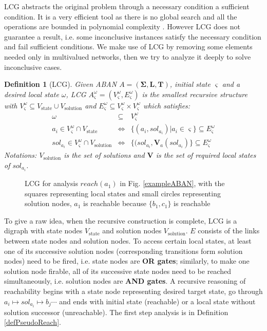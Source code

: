 \documentclass[en]{jdoc}
\newtheorem{definition}{Definition}
\newcommand{\omesi}{^\omega_\varsigma}
\begin{document}
LCG abstracts the original problem through a necessary condition a sufficient condition. 
It is a very efficient tool as there is no global search and all the operations are bounded in polynomial complexity \cite{pauleve2012}. 
However LCG does not guarantee a result, i.e. some inconclusive instances satisfy the necessary condition and fail sufficient conditions. 
We make use of LCG by removing some elements needed only in multivalued networks, then we try to analyze it deeply to solve inconclusive cases.
\begin{definition}[LCG]\label{defLCG}
Given ABAN $A = (\mathbf{\Sigma},\mathbf{L},\mathbf{T})$, initial state $\varsigma$ and a desired local state $\omega$, LCG $A\omesi= (V\omesi,E\omesi)$ is the smallest recursive structure with $V\omesi \subseteq V_{\text{state}}\cup V_{\text{solution}}$ and $E\omesi \subseteq V\omesi\times V\omesi$ which satisfies:
\begin{eqnarray*}
\omega&\subseteq& V\omesi \\
a_i\in V\omesi\cap V_{\text{state}} &\Leftrightarrow& \{ (a_i, sol_{a_i})| a_i\in \varsigma\}\subseteq E\omesi \\
sol_{a_i}\in V\omesi \cap V_{\text{solution}}&\Leftrightarrow& \{ (sol_{a_i},\mathbf{V}_a (sol_{a_i})\}\subseteq E\omesi
\end{eqnarray*}
Notations: $V_{\text{solution}}$ is the set of solutions and $\mathbf{V}$ is the set of required local states of $sol_{a_i}$.
\end{definition}

\begin{figure}[ht]
    \centering
    
    \caption{LCG for analysis $reach(a_1)$ in Fig. \ref{exampleABAN}, with the squares representing local states and small circles representing solution nodes, $a_1$ is reachable because $\{b_1,c_1\}$ is reachable}
    \label{LCGexample}
\end{figure}

To give a raw idea, when the recursive construction is complete, LCG is a digraph with state nodes $V_{\text{state}}$ and solution nodes $V_{\text{solution}}$. 
$E$ consists of the links between state nodes and solution nodes. To access certain local states, at least one of its successive solution nodes (corresponding transitions form solution nodes) need to be fired, i.e. state nodes are \textbf{OR gates}; similarly, to make one solution node firable, all of its successive state nodes need to be reached simultaneously, i.e. solution nodes are \textbf{AND gates}. 
A recursive reasoning of reachability begins with a state node representing desired target state, go through $a_i\mapsto sol_{a_i}\mapsto b_j \cdots$ and ends with initial state (reachable) or a local state without solution successor (unreachable). 
The first step analysis is in Definition \ref{defPseudoReach}.
\end{document}
